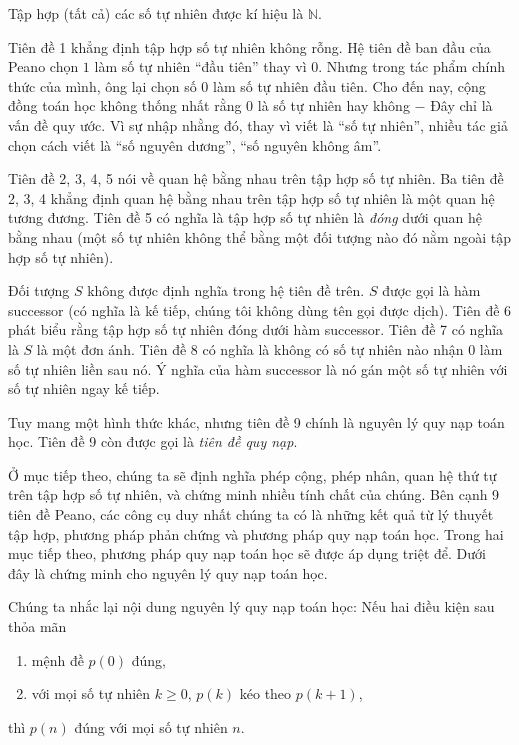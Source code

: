 Tập hợp (tất cả) các số tự nhiên được kí hiệu là $\mathbb{N}$.

Tiên đề 1 khẳng định tập hợp số tự nhiên không rỗng. Hệ tiên đề ban đầu của Peano chọn $1$ làm số tự nhiên ``đầu tiên'' thay vì $0$. Nhưng trong tác phẩm chính thức của mình, ông lại chọn số $0$ làm số tự nhiên đầu tiên. Cho đến nay, cộng đồng toán học không thống nhất rằng $0$ là số tự nhiên hay không $-$ Đây chỉ là vấn đề quy ước. Vì sự nhập nhằng đó, thay vì viết là ``số tự nhiên'', nhiều tác giả chọn cách viết là ``số nguyên dương'', ``số nguyên không âm''.

Tiên đề 2, 3, 4, 5 nói về quan hệ bằng nhau trên tập hợp số tự nhiên. Ba tiên đề 2, 3, 4 khẳng định quan hệ bằng nhau trên tập hợp số tự nhiên là một quan hệ tương đương. Tiên đề 5 có nghĩa là tập hợp số tự nhiên là \textit{đóng} dưới quan hệ bằng nhau (một số tự nhiên không thể bằng một đối tượng nào đó nằm ngoài tập hợp số tự nhiên).

Đối tượng $S$ không được định nghĩa trong hệ tiên đề trên. $S$ được gọi là hàm successor (có nghĩa là kế tiếp, chúng tôi không dùng tên gọi được dịch). Tiên đề 6 phát biểu rằng tập hợp số tự nhiên đóng dưới hàm successor. Tiên đề 7 có nghĩa là $S$ là một đơn ánh. Tiên đề 8 có nghĩa là không có số tự nhiên nào nhận $0$ làm số tự nhiên liền sau nó. Ý nghĩa của hàm successor là nó gán một số tự nhiên với số tự nhiên ngay kế tiếp.

Tuy mang một hình thức khác, nhưng tiên đề 9 chính là nguyên lý quy nạp toán học. Tiên đề 9 còn được gọi là \textit{tiên đề quy nạp}.

Ở mục tiếp theo, chúng ta sẽ định nghĩa phép cộng, phép nhân, quan hệ thứ tự trên tập hợp số tự nhiên, và chứng minh nhiều tính chất của chúng. Bên cạnh 9 tiên đề Peano, các công cụ duy nhất chúng ta có là những kết quả từ lý thuyết tập hợp, phương pháp phản chứng và phương pháp quy nạp toán học. Trong hai mục tiếp theo, phương pháp quy nạp toán học sẽ được áp dụng triệt để. Dưới đây là chứng minh cho nguyên lý quy nạp toán học.

Chúng ta nhắc lại nội dung nguyên lý quy nạp toán học: Nếu hai điều kiện sau thỏa mãn
\begin{enumerate}[label={(\roman*)},itemsep=0pt]
    \item mệnh đề $p(0)$ đúng,
    \item với mọi số tự nhiên $k\geq 0$, $p(k)$ kéo theo $p(k+1)$,
\end{enumerate}

thì $p(n)$ đúng với mọi số tự nhiên $n$.

